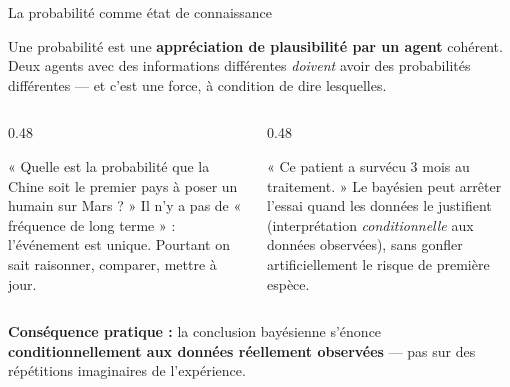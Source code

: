 \begin{frame}{La probabilité comme état de connaissance}
\begin{kbox}
Une probabilité est une \textbf{appréciation de plausibilité par un agent} cohérent.
Deux agents avec des informations différentes \emph{doivent} avoir des probabilités
différentes — et c'est une force, à condition de dire lesquelles.
\end{kbox}
\vspace{2mm}
\begin{columns}[t]
\begin{column}{0.48\textwidth}
\begin{ebox}
« Quelle est la probabilité que la Chine soit le premier pays à poser un humain sur Mars ? »
\vspace{1mm}
\footnotesize Il n'y a pas de « fréquence de long terme » : l'événement est unique.
Pourtant on sait raisonner, comparer, mettre à jour.
\end{ebox}
\end{column}
\begin{column}{0.48\textwidth}
\begin{ebox}
« Ce patient a survécu 3 mois au traitement. »
\vspace{1mm}
\footnotesize Le bayésien peut arrêter l'essai quand les données le justifient
(interprétation \textit{conditionnelle} aux données observées),
sans gonfler artificiellement le risque de première espèce.
\end{ebox}
\end{column}
\end{columns}
\vspace{1.5mm}
\begin{tcolorbox}[colback=byCyan!8,colframe=byCyan,arc=2mm,width=.95\textwidth]
\small\centering
\textbf{Conséquence pratique :} la conclusion bayésienne s'énonce
\textbf{conditionnellement aux données réellement observées} — pas sur des
répétitions imaginaires de l'expérience.
\end{tcolorbox}
\end{frame}

